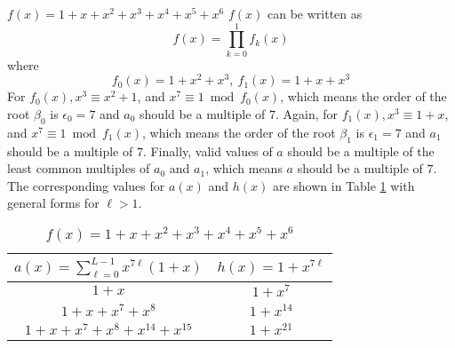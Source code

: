 \begin{example}
	$f(x)=1+x+x^2+x^3+x^4+x^5+x^6$\newline
	$f(x)$ can be written as 
	$$f(x)=\prod_{k=0}^{1}f_k(x)$$
	where 
	$$f_0(x)=1+x^2+x^3,~f_1(x)=1+x+x^3$$ 
	For $f_0(x), x^3 \equiv x^2+1$, and $x^7 \equiv 1 \bmod f_0(x)$, which means the order of the root $\beta_0$ is $\epsilon_0=7$ and $a_0$ should be a multiple of $7$. Again, for  $f_1(x), x^3 \equiv 1+x$, and $x^7 \equiv 1 \bmod f_1(x)$, which means the order of the root $\beta_1$ is $\epsilon_1=7$ and $a_1$ should be a multiple of $7$.
	Finally, valid values of $a$ should be a multiple of the least common multiples of $a_0$ and $a_1$, which means $a$ should be a multiple of $7$.
	The corresponding values for $a(x)$ and $h(x)$ are shown in Table \ref{novelTab1-b} with general forms for $\ell>1$.
	\begin{table}[htbp]
		\renewcommand{\arraystretch}{1.3}
		\caption{$f(x)=1+x+x^2+x^3+x^4+x^5+x^6$}
		\centering
		\begin{tabular}{c c } 
			\hline
			$a(x)=\sum_{\ell=0}^{L-1} x^{7\ell}(1+x)$ & $h(x)=1+x^{7\ell}$ \\ [0.5ex] 
			\hline\hline
			$1+x$ & $1+x^7$\\ 
			$1+x+x^7+x^8$ & $1+x^{14}$ \\
			$1+x+x^7+x^8+x^{14}+x^{15}$ & $1+x^{21}$
		\end{tabular}
		\label{novelTab1-b}
	\end{table}
	
\end{example}

